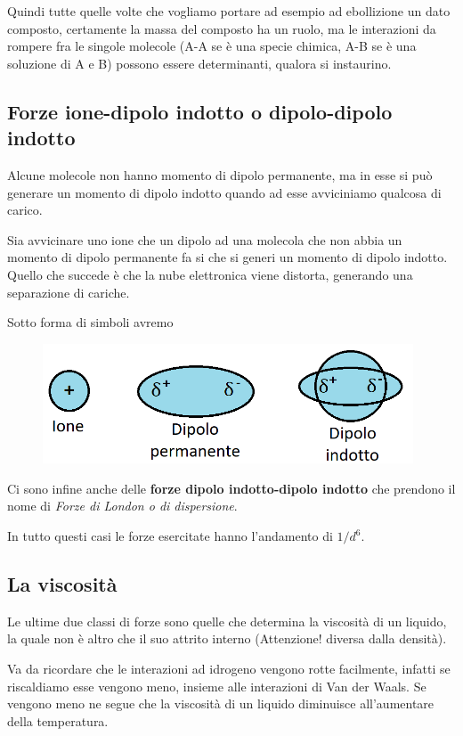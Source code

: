 \vspace{0.2cm}Quindi tutte quelle volte che vogliamo portare ad esempio ad ebollizione un dato composto, certamente la massa del composto ha un ruolo, ma le interazioni da rompere fra le singole molecole (A-A se è una specie chimica, A-B se è una soluzione di A e B) possono essere determinanti, qualora si instaurino.

\subsection{Forze ione-dipolo indotto o dipolo-dipolo indotto}
Alcune molecole non hanno momento di dipolo permanente, ma in esse si può generare un momento di dipolo indotto quando ad esse avviciniamo qualcosa di carico.

Sia avvicinare uno ione che un dipolo ad una molecola che non abbia un momento di dipolo permanente fa si che si generi un momento di dipolo indotto. Quello che succede è che la nube elettronica viene distorta, generando una separazione di cariche.

Sotto forma di simboli avremo

\begin{figure}[htp]
    \centering
    \includegraphics[width=11cm]{immagini/ioni_e_momenti_di_dipolo.png}
\end{figure}

Ci sono infine anche delle \textbf{forze dipolo indotto-dipolo indotto} che prendono il nome di \textit{Forze di London o di dispersione}.

In tutto questi casi le forze esercitate hanno l'andamento di $1/d^6$.
\subsection{La viscosità}
Le ultime due classi di forze sono quelle che determina la viscosità di un liquido, la quale non è altro che il suo attrito interno (Attenzione! \E diversa dalla densità).

Va da ricordare che le interazioni ad idrogeno vengono rotte facilmente, infatti se riscaldiamo esse vengono meno, insieme alle interazioni di Van der Waals. Se vengono meno ne segue che la viscosità di un liquido diminuisce all'aumentare della temperatura.